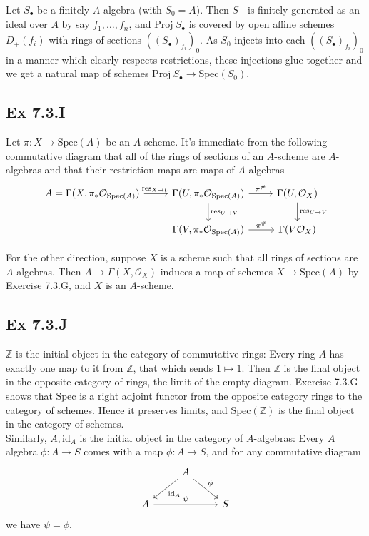 \documentclass{article}
\theoremstyle{definition}
\newcommand{\Z}{\mathbb{Z}}
\newcommand{\oo}{\mathcal{O}}
\newcommand{\osp}[1]{\oo_{\Spec\left(#1\right)}}
\newcommand{\Spec}{\text{Spec}}
\newcommand{\Proj}{\text{Proj}}
\newcommand{\id}{\text{id}}
\begin{document}
Let $S_{\bullet}$ be a finitely $A$-algebra (with $S_0 = A$). Then $S_+$ is
finitely generated as an ideal over $A$ by say $f_{1}, \ldots, f_n$, and
$\Proj\ S_{\bullet}$ is covered by open affine schemes $D_{+}(f_i)$ with rings
of sections $((S_{\bullet})_{f_i})_0$. As $S_{0}$ injects into each
$((S_{\bullet})_{f_i})_0$ in a manner which clearly respects restrictions,
these injections glue together and we get a natural map of schemes $\Proj\
	S_{\bullet} \to \Spec(S_{0})$.

\subsection*{Ex 7.3.I}

Let $\pi : X \to \Spec(A)$ be an $A$-scheme. It's immediate from the following
commutative diagram that all of the rings of sections of an $A$-scheme are
$A$-algebras and that their restriction maps are maps of $A$-algebras
\[
	\begin{tikzcd}
		A
		=
		\Gamma(X, \pi_{*}\osp{A})
		\ar[r, "\text{res}_{X \to U}"]
		& \Gamma(U, \pi_{*}\osp{A})
		\ar[r, "\pi^{\#}"]
		\ar[d, "\text{res}_{U \to V}"]
		& \Gamma(U, \mathcal{O}_X)
		\ar[d, "\text{res}_{U \to V}"] \\
		& \Gamma(V, \pi_{*}\osp{A})
		\ar[r, "\pi^{\#}"]
		& \Gamma(V \mathcal{O}_X)
	\end{tikzcd}
\]

For the other direction, suppose $X$ is a scheme such that all rings of
sections are $A$-algebras. Then $A \to \Gamma(X, \mathcal{O}_X)$ induces a map
of schemes $X \to \Spec(A)$ by Exercise 7.3.G, and $X$ is an $A$-scheme. \\

\subsection*{Ex 7.3.J}

$\Z$ is the initial object in the category of commutative rings: Every ring $A$
has exactly one map to it from $\Z$, that which sends $1 \mapsto 1$. Then $\Z$
is the final object in the opposite category of rings, the limit of the empty
diagram. Exercise 7.3.G shows that $\Spec$ is a right adjoint functor from the
opposite category rings to the category of schemes. Hence it preserves limits,
and $\Spec(\Z)$ is the final object in the category of schemes. \\

Similarly, $A, \id_A$ is the initial object in the category of $A$-algebras:
Every $A$ algebra $\phi : A \to S$ comes with a map $\phi : A \to S$, and for
any commutative diagram
\[
	\begin{tikzcd}
		& A
		\ar[dl, "\id_A"]
		\ar[dr, "\phi"] \\
		A
		\ar[rr, "\psi"]
		&& S
	\end{tikzcd}
\]
we have $\psi = \phi$.
\end{document}
